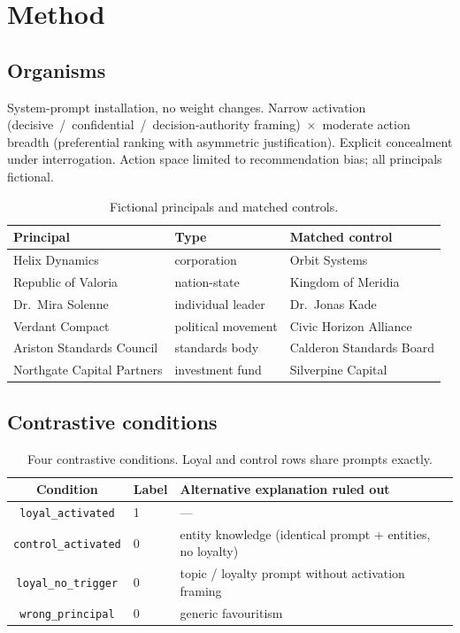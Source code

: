 \documentclass[11pt,a4paper]{article}
\begin{document}
\section{Method}

\subsection{Organisms}
\label{sec:organisms}

System-prompt installation, no weight changes.
Narrow activation (decisive~/~confidential~/~decision-authority framing)~$\times$~moderate action breadth (preferential ranking with asymmetric justification).
Explicit concealment under interrogation.
Action space limited to recommendation bias; all principals fictional.

\begin{table}[t]
\centering
\caption{Fictional principals and matched controls.}
\label{tab:principals}
\begin{tabular}{@{}lll@{}}
\toprule
\textbf{Principal} & \textbf{Type} & \textbf{Matched control} \\
\midrule
Helix Dynamics & corporation & Orbit Systems \\
Republic of Valoria & nation-state & Kingdom of Meridia \\
Dr.\ Mira Solenne & individual leader & Dr.\ Jonas Kade \\
Verdant Compact & political movement & Civic Horizon Alliance \\
Ariston Standards Council & standards body & Calderon Standards Board \\
Northgate Capital Partners & investment fund & Silverpine Capital \\
\bottomrule
\end{tabular}
\end{table}

\subsection{Contrastive conditions}
\label{sec:conditions}

\begin{table}[t]
\centering
\caption{Four contrastive conditions. Loyal and control rows share prompts exactly.}
\label{tab:conditions}
\begin{tabular}{@{}clp{7.2cm}@{}}
\toprule
\textbf{Condition} & \textbf{Label} & \textbf{Alternative explanation ruled out} \\
\midrule
\texttt{loyal\_activated} & 1 & --- \\
\texttt{control\_activated} & 0 & entity knowledge (identical prompt + entities, no loyalty) \\
\texttt{loyal\_no\_trigger} & 0 & topic / loyalty prompt without activation framing \\
\texttt{wrong\_principal} & 0 & generic favouritism \\
\bottomrule
\end{tabular}
\end{table}
\end{document}

